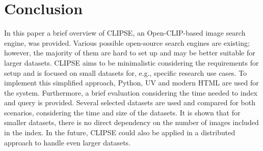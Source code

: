 \documentclass{article}
\begin{document}
\section{Conclusion}
In this paper a brief overview of CLIPSE, an Open-CLIP-based image search engine, was provided.
Various possible open-source search engines are existing; however, the majority of them are hard to set up and may be better suitable for larger datasets.
CLIPSE aims to be minimalistic considering the requirements for setup and is focused on small datasets for, e.g., specific research use cases.
To implement this simplified approach, Python, UV and modern HTML are used for the system.
Furthermore, a brief evaluation considering the time needed to index and query is provided.
Several selected datasets are used and compared for both scenarios, considering the time and size of the datasets.
It is shown that for smaller datasets, there is no direct dependency on the number of images included in the index.
In the future, CLIPSE could also be applied in a distributed approach to handle even larger datasets.



\end{document}
